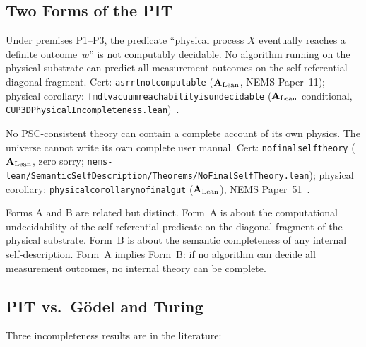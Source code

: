 \documentclass[11pt,openany]{book}
\theoremstyle{remark}
\newcommand{\lean}[1]{%
  \penalty-100
  \begingroup\def\_{\textunderscore\allowbreak}\texttt{#1}\endgroup}
\newcommand{\CatAL}{\ensuremath{\textbf{A}_{\rm Lean}}}
\begin{document}
\subsection*{Two Forms of the PIT}

\begin{tcolorbox}[colback=orange!5,colframe=orange!60,
  title={PIT Form A: Computational Undecidability (\CatAL)}]
  Under premises P1--P3, the predicate
  ``physical process $X$ eventually reaches a definite outcome~$w$''
  is not computably decidable.  No algorithm running on the physical substrate can
  predict all measurement outcomes on the self-referential diagonal fragment.
  Cert: \lean{asr\_rt\_not\_computable} (\CatAL, NEMS Paper~11);
  physical corollary: \lean{fmdl\_vacuum\_reachability\_is\_undecidable} (\CatAL
  conditional, \texttt{CUP3DPhysicalIncompleteness.lean})~\cite{SpivackGTEMobius}.
\end{tcolorbox}

\begin{tcolorbox}[colback=orange!5,colframe=orange!60,
  title={PIT Form B: No Final Self-Theory (\CatAL)}]
  No PSC-consistent theory can contain a complete account of its own physics.
  The universe cannot write its own complete user manual.
  Cert: \lean{no\_final\_self\_theory} (\CatAL, zero sorry;
  \texttt{nems-lean/SemanticSelfDescription/Theorems/NoFinalSelfTheory.lean});
  physical corollary: \lean{physical\_corollary\_no\_final\_gut} (\CatAL),
  NEMS Paper~51~\cite{SpivackNEMSHub}.
\end{tcolorbox}

Forms A and B are related but distinct.  Form~A is about the computational undecidability
of the self-referential predicate on the diagonal fragment of the physical substrate.
Form~B is about the semantic completeness of any internal self-description.
Form~A implies Form~B: if no algorithm can decide all measurement outcomes, no internal
theory can be complete.

\subsection*{PIT vs.\ G\"{o}del and Turing}

Three incompleteness results are in the literature:
\end{document}

